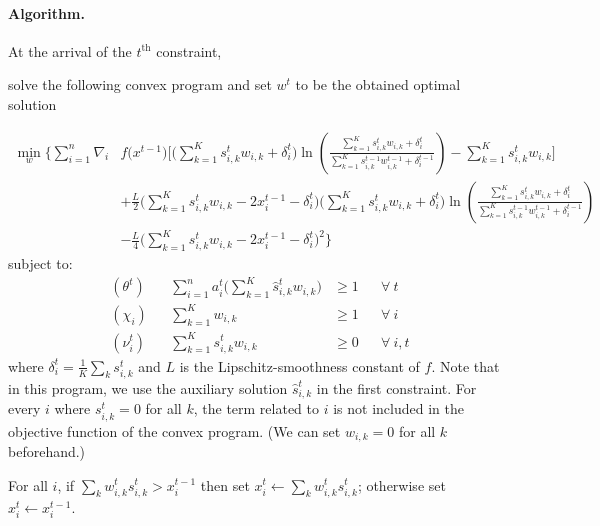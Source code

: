 \paragraph{Algorithm.}

At the arrival of the $t^{\text{th}}$ constraint,
\begin{compactenum}
	\item solve the following convex program and set $w^t$ to be the obtained optimal solution

\begin{align*}
\min_{w} \biggl\{\sum_{i=1}^{n}
    \nabla_{i} & f\bigl(x^{t-1} \bigr) \biggl[  \biggl(\sum_{k=1}^{K} s_{i,k}^{t} w_{i,k}  + \delta_{i}^{t} \biggr)
                     \ln \left(\frac{ \sum_{k=1}^{K} s_{i,k}^{t} w_{i,k}  + \delta_{i}^{t} }{\sum_{k=1}^{K} s_{i,k}^{t-1} w_{i,k}^{t-1} + \delta_{i}^{t-1}}\right)
                                    - \sum_{k=1}^{K}  s_{i,k}^{t} w_{i,k} \biggr] \\
            &+ \frac{L}{2}\biggl( \sum_{k=1}^{K} s_{i,k}^{t} w_{i,k}  - 2x_{i}^{t-1} - \delta_{i}^{t} \biggr) \biggl(\sum_{k=1}^{K} s_{i,k}^{t} w_{i,k} + \delta_{i}^{t} \biggr)
                \ln \left(\frac{ \sum_{k=1}^{K} s_{i,k}^{t} w_{i,k}  + \delta_{i}^{t} }{\sum_{k=1}^{K} s_{i,k}^{t-1} w_{i,k}^{t-1}  + \delta_{i}^{t-1}}\right) \\
            &- \frac{L}{4} \biggl( \sum_{k=1}^{K} s_{i,k}^{t} w_{i,k}  - 2x_{i}^{t-1} - \delta_{i}^{t} \biggr)^{2}
        \biggr\}
\end{align*}
%
\noindent subject to:
%
\begin{align*}
    (\theta^{t})  && \sum_{i=1}^{n} a_{i}^{t} \biggl( \sum_{k=1}^{K}  \hat{s}_{i,k}^{t} w_{i,k} \biggr) &\geq 1 && \forall\ t\\
%
    (\chi_{i}) && \sum_{k=1}^{K}  w_{i,k} &\geq 1 && \forall\ i\\
%
    (\nu_{i}^{t}) && \sum_{k=1}^{K} s_{i,k}^{t} w_{i,k} &\geq 0 && \forall\ i,t
\end{align*}
%
where $\delta_{i}^{t} = \frac{1}{K} \sum_{k} s_{i,k}^{t}$ and $L$ is the Lipschitz-smoothness constant of $f$.
Note that in this program, we use the auxiliary solution $\hat{s}_{i,k}^{t}$ in the first constraint. For every $i$ where $s_{i,k}^{t} = 0$ for all $k$, the term related to $i$ is not included in the objective function of the convex program.
(We can set $w_{i,k} = 0$ for all $k$ beforehand.)
	\item For all $i$, if $\sum_{k} w_{i,k}^{t} s_{i,k}^{t} > x_{i}^{t-1}$ then set $x_{i}^{t} \gets \sum_{k} w_{i,k}^{t} s_{i,k}^{t}$;
otherwise set $x_{i}^{t} \gets x_{i}^{t-1}$.
\end{compactenum}


